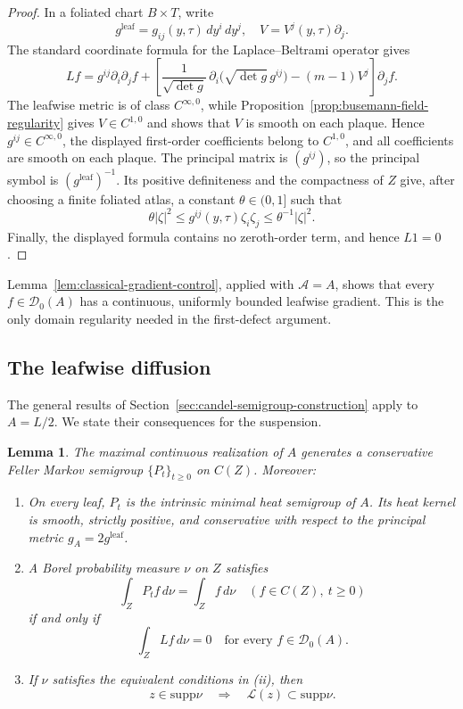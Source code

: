 \documentclass[12pt]{amsart}
\newtheorem{lemma}[theorem]{Lemma}
\theoremstyle{definition}
\numberwithin{equation}{section}
\newcommand{\mc}{\mathcal}
\newcommand{\ms}{\mathscr}
\newcommand{\supp}{\mathrm{supp}}
\begin{document}
\begin{proof}
In a foliated chart \(B\times T\), write
\[
  g^{\mathrm{leaf}}=g_{ij}(y,\tau)\,dy^i\,dy^j,
  \quad
  V=V^j(y,\tau)\partial_j.
\]
The standard coordinate formula for the Laplace--Beltrami operator gives
\[
  Lf
  =g^{ij}\partial_i\partial_jf
   +\left[
      \frac1{\sqrt{\det g}}\,
      \partial_i\bigl(\sqrt{\det g}\,g^{ij}\bigr)
      -(m-1)V^j
    \right]\partial_jf.
\]
The leafwise metric is of class \(C^{\infty,0}\), while
Proposition~\ref{prop:busemann-field-regularity} gives
\(V\in C^{1,0}\) and shows that \(V\) is smooth on each plaque.  Hence
\(g^{ij}\in C^{\infty,0}\), the displayed first-order coefficients belong
to \(C^{1,0}\), and all coefficients are smooth on each plaque.  The
principal matrix is \((g^{ij})\), so the principal symbol is
\((g^{\mathrm{leaf}})^{-1}\).  Its positive definiteness and the
compactness of \(Z\) give, after choosing a finite foliated atlas, a
constant \(\theta\in(0,1]\) such that
\[
  \theta|\zeta|^2
  \leq g^{ij}(y,\tau)\zeta_i\zeta_j
  \leq\theta^{-1}|\zeta|^2.
\]
Finally, the displayed formula contains no zeroth-order term, and hence
\(L1=0\).
\end{proof}

Lemma~\ref{lem:classical-gradient-control}, applied with
\(\ms A=A\), shows that every \(f\in\mc D_0(A)\) has a continuous,
uniformly bounded leafwise gradient.  This is the only domain
regularity needed in the first-defect argument.

\subsection{The leafwise diffusion}

The general results of Section~\ref{sec:candel-semigroup-construction}
apply to \(A=L/2\).  We state their consequences for the suspension.

\begin{lemma}
\label{lem:saturated-support}
The maximal continuous realization of \(A\) generates a conservative
Feller Markov semigroup \(\{P_t\}_{t\geq0}\) on \(C(Z)\).  Moreover:
\begin{enumerate}[label=\textup{(\roman*)}]
\item On every leaf, \(P_t\) is the intrinsic minimal heat semigroup of
\(A\).  Its heat kernel is smooth, strictly positive, and conservative
with respect to the principal metric \(g_A=2g^{\mathrm{leaf}}\).

\item A Borel probability measure \(\nu\) on \(Z\) satisfies
\[
  \int_ZP_tf\,d\nu=\int_Zf\,d\nu
  \quad(f\in C(Z),\ t\geq0)
\]
if and only if
\begin{equation}\label{eq:infinitesimal-stationarity}
  \int_ZLf\,d\nu=0
  \quad\text{for every }f\in\mc D_0(A).
\end{equation}

\item If \(\nu\) satisfies the equivalent conditions in
\textup{(ii)}, then
\[
  z\in\supp\nu\quad\Longrightarrow\quad
  \mc L(z)\subset\supp\nu.
\]
\end{enumerate}
\end{lemma}
\end{document}
